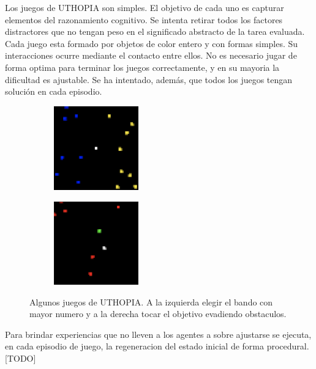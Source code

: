 Los juegos de UTHOPIA son simples. El objetivo de cada uno es capturar elementos del razonamiento cognitivo. Se intenta retirar todos los factores distractores que no tengan peso en el significado abstracto de la tarea evaluada. Cada juego esta formado por objetos de color entero y con formas simples. Su interacciones ocurre mediante el contacto entre ellos. No es necesario jugar de forma optima para terminar los juegos correctamente, y en su mayoria la dificultad es ajustable. Se ha intentado, además, que todos los juegos tengan solución en cada episodio. 


\begin{figure}[ht!]
    \centering
    \begin{subfigure}
      \centering
      \includegraphics[width=0.4\textwidth]{Graphics/uthopia_count_war_1.png}
      \label{fig:uthopia1}
    \end{subfigure}%
    \begin{subfigure}
      \centering
      \includegraphics[width=0.4\textwidth]{Graphics/uthopia_evade_1.png}
      \label{fig:uthopia2}
    \end{subfigure}%
    \caption{Algunos juegos de UTHOPIA. A la izquierda elegir el bando con mayor numero y a la derecha tocar el objetivo evadiendo obstaculos.}
    \label{fig:uthopia}
\end{figure}

Para brindar experiencias que no lleven a los agentes a sobre ajustarse se ejecuta, en cada episodio de juego, la regeneracion del estado inicial de forma procedural. [TODO]

